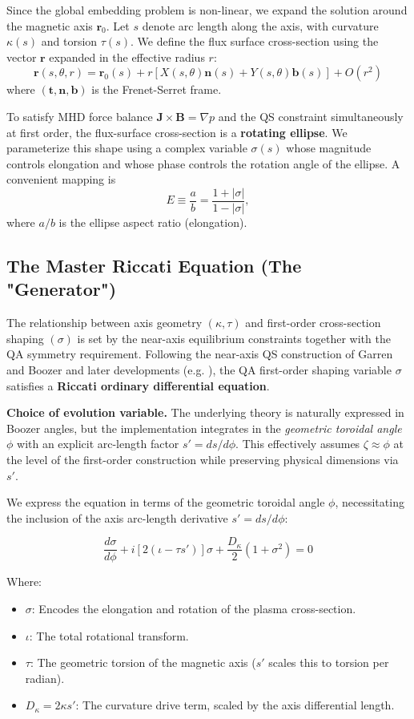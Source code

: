 \documentclass{article}
\begin{document}
Since the global embedding problem is non-linear, we expand the solution around the magnetic axis $\mathbf{r}_0$. Let $s$ denote arc length along the axis, with curvature $\kappa(s)$ and torsion $\tau(s)$.
We define the flux surface cross-section using the vector $\mathbf{r}$ expanded in the effective radius $r$:
\[ \mathbf{r}(s, \theta, r) = \mathbf{r}_0(s) + r \left[ X(s, \theta)\mathbf{n}(s) + Y(s, \theta)\mathbf{b}(s) \right] + O(r^2) \]
where $(\mathbf{t}, \mathbf{n}, \mathbf{b})$ is the Frenet-Serret frame.

To satisfy MHD force balance $\mathbf{J} \times \mathbf{B} = \nabla p$ and the QS constraint simultaneously at first order, the flux-surface cross-section is a \textbf{rotating ellipse}. We parameterize this shape using a complex variable $\sigma(s)$ whose magnitude controls elongation and whose phase controls the rotation angle of the ellipse. A convenient mapping is
\[
E \equiv \frac{a}{b} = \frac{1+|\sigma|}{1-|\sigma|},
\]
where $a/b$ is the ellipse aspect ratio (elongation).

\subsection{The Master Riccati Equation (The "Generator")}

The relationship between axis geometry $(\kappa, \tau)$ and first-order cross-section shaping $(\sigma)$ is set by the near-axis equilibrium constraints together with the QA symmetry requirement. Following the near-axis QS construction of Garren and Boozer \cite{garren1991} and later developments (e.g. \cite{landreman2019}), the QA first-order shaping variable $\sigma$ satisfies a \textbf{Riccati ordinary differential equation}.

\textbf{Choice of evolution variable.} The underlying theory is naturally expressed in Boozer angles, but the implementation integrates in the \emph{geometric toroidal angle} $\phi$ with an explicit arc-length factor $s' = ds/d\phi$. This effectively assumes $\zeta \approx \phi$ at the level of the first-order construction while preserving physical dimensions via $s'$.

We express the equation in terms of the geometric toroidal angle $\phi$, necessitating the inclusion of the axis arc-length derivative $s' = ds/d\phi$:

\[ \frac{d\sigma}{d\phi} + i \left[ 2(\iota - \tau s') \right] \sigma + \frac{D_\kappa}{2} (1 + \sigma^2) = 0 \]

Where:
\begin{itemize}
    \item $\sigma$: Encodes the elongation and rotation of the plasma cross-section.
    \item $\iota$: The total rotational transform.
    \item $\tau$: The geometric torsion of the magnetic axis ($s'$ scales this to torsion per radian).
    \item $D_\kappa = 2 \kappa s'$: The curvature drive term, scaled by the axis differential length.
\end{itemize}
\end{document}
